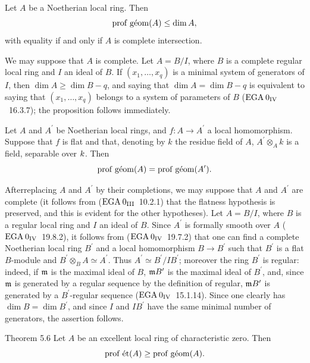 \begin{proposition} \label{XIV.5.4} Let $A$ be a Noetherian local ring. Then
$$
\profgeom(A)\leq\dim A,
$$
with equality if and only if $A$ is  complete intersection.
\end{proposition}

We may suppose that $A$ is complete. Let $A=B/I$, where $B$ is a complete regular local ring and $I$ an ideal of $B$. If $(x_{1},\dots, x_{q})$ is a minimal system of generators of $I$, then $\dim A\geq\dim B-q$, and saying that $\dim A=\dim B-q$ is equivalent to saying that $(x_{1},\dots, x_{q})$ belongs to a system of parameters of $B$ ($\EGA 0_{\textup{IV}}$~16.3.7); the proposition follows immediately.

\begin{proposition} \label{XIV.5.5} Let $A$ and $A^{\prime}$ be Noetherian local rings, and $f\colon A\to A^{\prime}$ a local homomorphism. Suppose that $f$ is flat and that, denoting by $k$ the residue field of $A$, $A^{\prime}\otimes_{A}k$ is a field, separable over $\sisi{K}{k}$. Then
$$
\profgeom(A)=\profgeom(A^{\prime}).
$$
\end{proposition}

After\pageoriginale replacing $A$ and $A^{\prime}$ by their completions, we may suppose that $A$ and $A^{\prime}$ are complete (it follows from ($\EGA 0_{\textup{III}}$~10.2.1) that the flatness hypothesis is preserved, and this is evident for the other hypotheses). Let $A=B/I$, where $B$ is a regular local ring and $I$ an ideal of $B$. Since $A^{\prime}$ is formally smooth over $A$ ($\EGA 0_{\textup{IV}}$~19.8.2), it follows from ($\EGA 0_{\textup{IV}}$~19.7.2) that one can find a complete Noetherian local ring $B^{\prime}$ and a local homomorphism $B\to B^{\prime}$ such that $B^{\prime}$ is a flat $B$-module and $B^{\prime}\otimes_{B}A\simeq A^{\prime}$. Thus $A^{\prime}\simeq B^{\prime}/IB^{\prime}$; moreover the ring $B^{\prime}$ is regular: indeed, if $\mm$ is the maximal ideal of $B$, $\mm B^{\prime}$ is the maximal ideal of $B^{\prime}$, and, since $\mm$ is generated by a regular sequence by the definition of \og regular\fg, $\sisi{B^{\prime}}{\mm B^{\prime}}$ is generated by a $B^{\prime}$-regular sequence ($\EGA 0_{\textup{IV}}$~15.1.14). Since one clearly has $\dim B=\dim B^{\prime}$, and since $I$ and $IB^{\prime}$ have the same minimal number of generators, the assertion follows.

\label{XIV.5.6}
\begin{enonce*}{Theorem 5.6}
Let $A$ be an excellent local ring of characteristic zero. Then
$$
\profet(A)\geq\profgeom(A).
$$
\end{enonce*}

